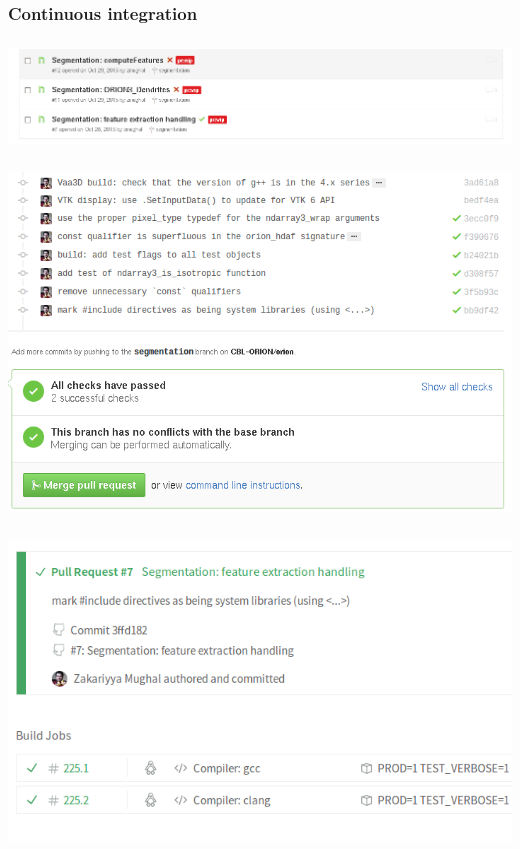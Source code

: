 \documentclass{beamer}
\begin{document}
\subsubsection{Continuous integration}
\begin{frame}\frametitle{\subsecname} \centering\includegraphics[width=1.0\textwidth]{gfx/ci-0} \end{frame}
\begin{frame}\frametitle{\subsecname} \centering\includegraphics[width=1.0\textwidth]{gfx/ci-1} \end{frame}
\begin{frame}\frametitle{\subsecname} \centering\includegraphics[width=1.0\textwidth]{gfx/ci-2} \end{frame}
\end{document}
